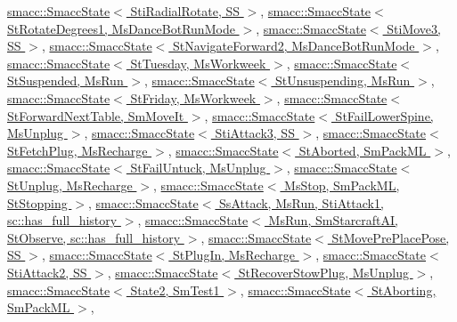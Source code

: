 \hyperlink{classsmacc_1_1SmaccState_afc39f8e0ca4001b2159a100da2fccd0e}{smacc\+::\+Smacc\+State$<$ Sti\+Radial\+Rotate, S\+S $>$}, \hyperlink{classsmacc_1_1SmaccState_afc39f8e0ca4001b2159a100da2fccd0e}{smacc\+::\+Smacc\+State$<$ St\+Rotate\+Degrees1, Ms\+Dance\+Bot\+Run\+Mode $>$}, \hyperlink{classsmacc_1_1SmaccState_afc39f8e0ca4001b2159a100da2fccd0e}{smacc\+::\+Smacc\+State$<$ Sti\+Move3, S\+S $>$}, \hyperlink{classsmacc_1_1SmaccState_afc39f8e0ca4001b2159a100da2fccd0e}{smacc\+::\+Smacc\+State$<$ St\+Navigate\+Forward2, Ms\+Dance\+Bot\+Run\+Mode $>$}, \hyperlink{classsmacc_1_1SmaccState_afc39f8e0ca4001b2159a100da2fccd0e}{smacc\+::\+Smacc\+State$<$ St\+Tuesday, Ms\+Workweek $>$}, \hyperlink{classsmacc_1_1SmaccState_afc39f8e0ca4001b2159a100da2fccd0e}{smacc\+::\+Smacc\+State$<$ St\+Suspended, Ms\+Run $>$}, \hyperlink{classsmacc_1_1SmaccState_afc39f8e0ca4001b2159a100da2fccd0e}{smacc\+::\+Smacc\+State$<$ St\+Unsuspending, Ms\+Run $>$}, \hyperlink{classsmacc_1_1SmaccState_afc39f8e0ca4001b2159a100da2fccd0e}{smacc\+::\+Smacc\+State$<$ St\+Friday, Ms\+Workweek $>$}, \hyperlink{classsmacc_1_1SmaccState_afc39f8e0ca4001b2159a100da2fccd0e}{smacc\+::\+Smacc\+State$<$ St\+Forward\+Next\+Table, Sm\+Move\+It $>$}, \hyperlink{classsmacc_1_1SmaccState_afc39f8e0ca4001b2159a100da2fccd0e}{smacc\+::\+Smacc\+State$<$ St\+Fail\+Lower\+Spine, Ms\+Unplug $>$}, \hyperlink{classsmacc_1_1SmaccState_afc39f8e0ca4001b2159a100da2fccd0e}{smacc\+::\+Smacc\+State$<$ Sti\+Attack3, S\+S $>$}, \hyperlink{classsmacc_1_1SmaccState_afc39f8e0ca4001b2159a100da2fccd0e}{smacc\+::\+Smacc\+State$<$ St\+Fetch\+Plug, Ms\+Recharge $>$}, \hyperlink{classsmacc_1_1SmaccState_afc39f8e0ca4001b2159a100da2fccd0e}{smacc\+::\+Smacc\+State$<$ St\+Aborted, Sm\+Pack\+M\+L $>$}, \hyperlink{classsmacc_1_1SmaccState_afc39f8e0ca4001b2159a100da2fccd0e}{smacc\+::\+Smacc\+State$<$ St\+Fail\+Untuck, Ms\+Unplug $>$}, \hyperlink{classsmacc_1_1SmaccState_afc39f8e0ca4001b2159a100da2fccd0e}{smacc\+::\+Smacc\+State$<$ St\+Unplug, Ms\+Recharge $>$}, \hyperlink{classsmacc_1_1SmaccState_afc39f8e0ca4001b2159a100da2fccd0e}{smacc\+::\+Smacc\+State$<$ Ms\+Stop, Sm\+Pack\+M\+L, St\+Stopping $>$}, \hyperlink{classsmacc_1_1SmaccState_afc39f8e0ca4001b2159a100da2fccd0e}{smacc\+::\+Smacc\+State$<$ Ss\+Attack, Ms\+Run, Sti\+Attack1, sc\+::has\+\_\+full\+\_\+history $>$}, \hyperlink{classsmacc_1_1SmaccState_afc39f8e0ca4001b2159a100da2fccd0e}{smacc\+::\+Smacc\+State$<$ Ms\+Run, Sm\+Starcraft\+A\+I, St\+Observe, sc\+::has\+\_\+full\+\_\+history $>$}, \hyperlink{classsmacc_1_1SmaccState_afc39f8e0ca4001b2159a100da2fccd0e}{smacc\+::\+Smacc\+State$<$ St\+Move\+Pre\+Place\+Pose, S\+S $>$}, \hyperlink{classsmacc_1_1SmaccState_afc39f8e0ca4001b2159a100da2fccd0e}{smacc\+::\+Smacc\+State$<$ St\+Plug\+In, Ms\+Recharge $>$}, \hyperlink{classsmacc_1_1SmaccState_afc39f8e0ca4001b2159a100da2fccd0e}{smacc\+::\+Smacc\+State$<$ Sti\+Attack2, S\+S $>$}, \hyperlink{classsmacc_1_1SmaccState_afc39f8e0ca4001b2159a100da2fccd0e}{smacc\+::\+Smacc\+State$<$ St\+Recover\+Stow\+Plug, Ms\+Unplug $>$}, \hyperlink{classsmacc_1_1SmaccState_afc39f8e0ca4001b2159a100da2fccd0e}{smacc\+::\+Smacc\+State$<$ State2, Sm\+Test1 $>$}, \hyperlink{classsmacc_1_1SmaccState_afc39f8e0ca4001b2159a100da2fccd0e}{smacc\+::\+Smacc\+State$<$ St\+Aborting, Sm\+Pack\+M\+L $>$}, 